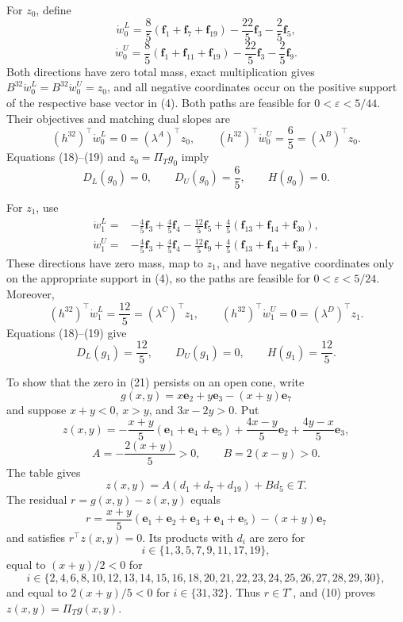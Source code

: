 For \(z_0\), define
\[
\dot w^L_0=\frac85(\mathbf f_1+\mathbf f_7+\mathbf f_{19})
-\frac{22}{5}\mathbf f_3-\frac25\mathbf f_5,
\]
\[
\dot w^U_0=\frac85(\mathbf f_1+\mathbf f_{11}+\mathbf f_{19})
-\frac{22}{5}\mathbf f_3-\frac25\mathbf f_9.
\tag{20}
\]
Both directions have zero total mass, exact multiplication gives \(B^{32}\dot w^L_0=B^{32}\dot w^U_0=z_0\), and all negative coordinates occur on the positive support of the respective base vector in (4).  Both paths are feasible for \(0<\varepsilon<5/44\).  Their objectives and matching dual slopes are
\[
(h^{32})^{\top}\dot w^L_0=0=(\lambda^A)^{\top}z_0,
\qquad
(h^{32})^{\top}\dot w^U_0=\frac65=(\lambda^B)^{\top}z_0.
\]
Equations (18)--(19) and \(z_0=\Pi_Tg_0\) imply
\[
D_L(g_0)=0,
\qquad
D_U(g_0)=\frac65,
\qquad
H(g_0)=0.
\tag{21}
\]

For \(z_1\), use
\[
\begin{aligned}
\dot w^L_1={}&-\frac45\mathbf f_3+\frac45\mathbf f_4-\frac{12}{5}\mathbf f_5
+\frac45(\mathbf f_{13}+\mathbf f_{14}+\mathbf f_{30}),\\
\dot w^U_1={}&-\frac45\mathbf f_3+\frac45\mathbf f_4-\frac{12}{5}\mathbf f_9
+\frac45(\mathbf f_{13}+\mathbf f_{14}+\mathbf f_{30}).
\end{aligned}
\tag{22}
\]
These directions have zero mass, map to \(z_1\), and have negative coordinates only on the appropriate support in (4), so the paths are feasible for \(0<\varepsilon<5/24\).  Moreover,
\[
(h^{32})^{\top}\dot w^L_1=\frac{12}{5}=(\lambda^C)^{\top}z_1,
\qquad
(h^{32})^{\top}\dot w^U_1=0=(\lambda^D)^{\top}z_1.
\]
Equations (18)--(19) give
\[
D_L(g_1)=\frac{12}{5},
\qquad
D_U(g_1)=0,
\qquad
H(g_1)=\frac{12}{5}.
\tag{23}
\]

To show that the zero in (21) persists on an open cone, write
\[
g(x,y)=x\mathbf e_2+y\mathbf e_3-(x+y)\mathbf e_7
\]
and suppose \(x+y<0\), \(x>y\), and \(3x-2y>0\).  Put
\[
z(x,y)=-\frac{x+y}{5}(\mathbf e_1+\mathbf e_4+\mathbf e_5)
+\frac{4x-y}{5}\mathbf e_2+\frac{4y-x}{5}\mathbf e_3,
\tag{24}
\]
\[
A=-\frac{2(x+y)}5>0,
\qquad
B=2(x-y)>0.
\]
The table gives
\[
z(x,y)=A(d_1+d_7+d_{19})+Bd_5\in T.
\tag{25}
\]
The residual \(r=g(x,y)-z(x,y)\) equals
\[
r=\frac{x+y}{5}(\mathbf e_1+\mathbf e_2+\mathbf e_3+\mathbf e_4+\mathbf e_5)
-(x+y)\mathbf e_7
\tag{26}
\]
and satisfies \(r^{\top}z(x,y)=0\).  Its products with \(d_i\) are zero for
\[
i\in\{1,3,5,7,9,11,17,19\},
\]
equal to \((x+y)/2<0\) for
\[
i\in\{2,4,6,8,10,12,13,14,15,16,18,20,21,22,23,24,25,26,27,28,29,30\},
\]
and equal to \(2(x+y)/5<0\) for \(i\in\{31,32\}\).  Thus \(r\in T^\circ\), and (10) proves \(z(x,y)=\Pi_Tg(x,y)\).

